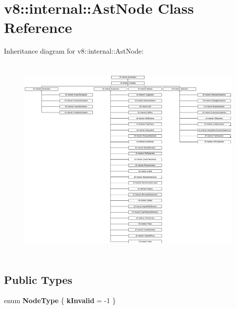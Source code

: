\hypertarget{classv8_1_1internal_1_1_ast_node}{}\section{v8\+:\+:internal\+:\+:Ast\+Node Class Reference}
\label{classv8_1_1internal_1_1_ast_node}
Inheritance diagram for v8\+:\+:internal\+:\+:Ast\+Node\+:\begin{figure}[H]
\begin{center}
\leavevmode
\includegraphics[height=10.370370cm]{classv8_1_1internal_1_1_ast_node}
\end{center}
\end{figure}
\subsection*{Public Types}
\begin{DoxyCompactItemize}
\item 
enum {\bfseries Node\+Type} \{ {\bfseries k\+Invalid} = -\/1
 \}\hypertarget{classv8_1_1internal_1_1_ast_node_ab81d3ee3986451cb591842b06c4ee3bc}{}\label{classv8_1_1internal_1_1_ast_node_ab81d3ee3986451cb591842b06c4ee3bc}

\end{DoxyCompactItemize}
